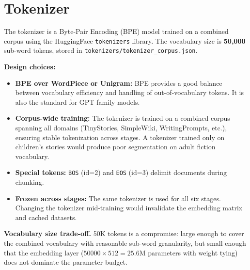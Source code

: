 \section{Tokenizer}
\label{sec:tokenizer}

The tokenizer is a Byte-Pair Encoding (BPE) model trained on a combined corpus
using the HuggingFace \texttt{tokenizers} library.  The vocabulary size is
\textbf{50{,}000} sub-word tokens, stored in
\texttt{tokenizers/tokenizer\_corpus.json}.

\textbf{Design choices:}
\begin{itemize}[nosep]
  \item \textbf{BPE over WordPiece or Unigram:}  BPE provides a good balance
        between vocabulary efficiency and handling of out-of-vocabulary tokens.
        It is also the standard for GPT-family models.
  \item \textbf{Corpus-wide training:}  The tokenizer is trained on a combined
        corpus spanning all domains (TinyStories, SimpleWiki, WritingPrompts,
        etc.), ensuring stable tokenization across stages.  A tokenizer trained
        only on children's stories would produce poor segmentation on adult
        fiction vocabulary.
  \item \textbf{Special tokens:}  \texttt{BOS} (id=2) and \texttt{EOS} (id=3)
        delimit documents during chunking.
  \item \textbf{Frozen across stages:}  The same tokenizer is used for all
        six stages.  Changing the tokenizer mid-training would invalidate the
        embedding matrix and cached datasets.
\end{itemize}

\textbf{Vocabulary size trade-off.}  50K tokens is a compromise: large enough
to cover the combined vocabulary with reasonable sub-word granularity, but
small enough that the embedding layer ($50000 \times 512 = 25.6$M parameters
with weight tying) does not dominate the parameter budget.
